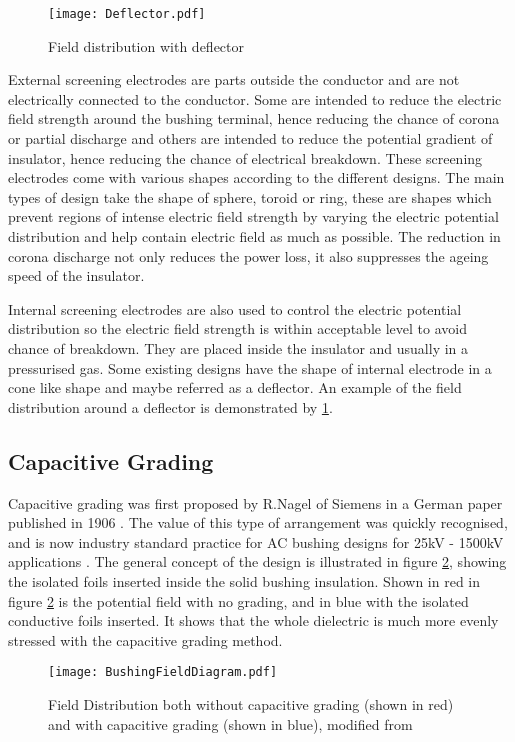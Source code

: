 \begin{figure}[!h]
   \centering
   \texttt{[image: Deflector.pdf]}
   \caption{Field distribution with deflector}
   \label{figure:deflector}
\end{figure}

External screening electrodes are parts outside the conductor and are not electrically connected to the conductor. Some are intended to reduce the electric field strength around the bushing terminal, hence reducing the chance of corona or partial discharge and others are intended to reduce the potential gradient of insulator, hence reducing the chance of electrical breakdown. These screening electrodes come with various shapes according to the different designs. The main types of design take the shape of sphere, toroid or ring, these are shapes which prevent regions of intense electric field strength by varying the electric potential distribution and help contain electric field as much as possible. The reduction in corona discharge not only reduces the power loss, it also suppresses the ageing speed of the insulator.

Internal screening electrodes are also used to control the electric potential distribution so the electric field strength is within acceptable level to avoid chance of breakdown. They are placed inside the insulator and usually in a pressurised gas. Some existing designs have the shape of internal electrode in a cone like shape and maybe referred as a deflector. An example of the field distribution around a deflector is demonstrated by \ref{figure:deflector}.
 

\subsection{Capacitive Grading} \label{ss:CapacitiveGrading}
Capacitive grading was first proposed by R.Nagel of Siemens in a German paper published in 1906 \cite{harlow2004electric}.
The value of this type of arrangement was quickly recognised, and is now industry standard practice for AC bushing designs for 25kV - 1500kV applications \cite{james2008condition}.
The general concept of the design is illustrated in figure \ref{figure:fieldgeneric}, showing the isolated foils inserted inside the solid bushing insulation.
Shown in red in figure \ref{figure:fieldgeneric} is the potential field with no grading, and in blue with the isolated conductive foils inserted.
It shows that the whole dielectric is much more evenly stressed with the capacitive grading method.
\begin{figure}[!h]
   \centering
   \texttt{[image: BushingFieldDiagram.pdf]}
   \caption{Field Distribution both without capacitive grading (shown in red) and with capacitive grading (shown in blue), modified from \cite{james2008condition}}
   \label{figure:fieldgeneric}
\end{figure}

